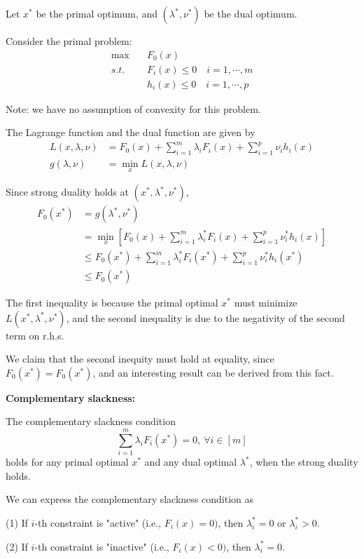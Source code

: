 Let $x^*$ be the primal optimum, and $(\lambda^*,\nu^*)$ be the dual optimum.

Consider the primal problem:
\begin{align*}
\max\quad &F_0(x)\\
s.t.\quad &F_i(x)\leq 0\quad i = 1,\cdots,m\\
&h_i(x)\leq 0\quad i = 1,\cdots,p
\end{align*}

Note: we have no assumption of convexity for this problem.

The Lagrange function and the dual function are given by 
\begin{align*}
L(x,\lambda,\nu) &= F_0(x)+\sum^m_{i=1}\lambda_iF_i(x) + \sum^p_{i=1}\nu_ih_i(x)\\
g(\lambda,\nu)&= \min_xL(x,\lambda,\nu)
\end{align*}

Since strong duality holds at $(x^*,\lambda^*,\nu^*)$,
\begin{align*}
F_0(x^*) 
&= g(\lambda^*,\nu^*) \\
&= \min_{x}[F_0(x)+\sum^m_{i=1}\lambda_i^*F_i(x) + \sum^p_{i=1}\nu_i^*h_i(x)]\\
&\leq F_0(x^*) +\sum^m_{i=1}\lambda_i^* F_i(x^*) + \sum^p_{i=1}\nu_i^* h_i(x^*)\\
&\leq F_0(x^*)
\end{align*}


The first inequality is because the primal optimal $x^*$ must minimize $L(x^*,\lambda^*,\nu^*)$, and the second inequality is due to the negativity of the second term on r.h.s. 

We claim that the second inequity must hold at equality, since $F_0(x^*)=F_0(x^*)$, and an interesting result can be derived from this fact.


\vspace{0.3cm}
\textbf{Complementary slackness:}

The complementary slackness condition
$$\sum^m_{i=1}\lambda_iF_i(x^*)=0,\ \forall i\in [m]$$
holds for any primal optimal $x^*$ and any dual optimal $\lambda^*$, when the strong duality holds.

We can express the complementary slackness condition as

	(1) If $i$-th constraint is "active" (i.e., $F_i(x)=0)$, then $\lambda_i^*=0$ or $\lambda_i^*>0$.
	
	(2) If $i$-th constraint is "inactive" (i.e., $F_i(x)<0)$, then $\lambda_i^*=0$.

